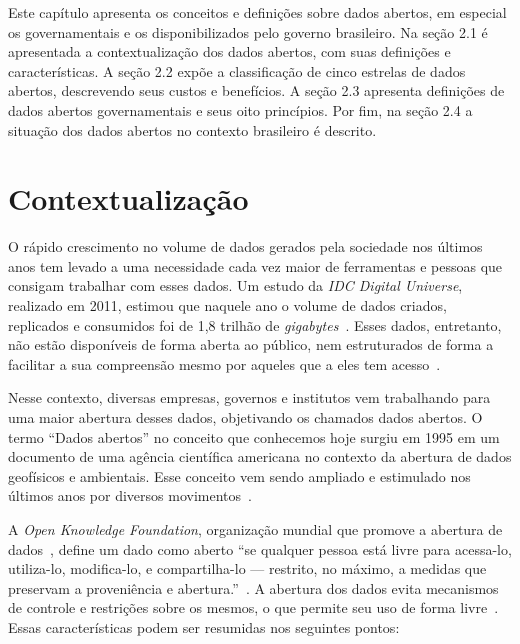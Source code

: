 Este capítulo apresenta os conceitos e definições sobre dados abertos, em especial os governamentais e os disponibilizados pelo governo brasileiro. Na seção 2.1 é apresentada a contextualização dos dados abertos, com suas definições e características. A seção 2.2 expõe a classificação de cinco estrelas de dados abertos, descrevendo seus custos e benefícios. A seção 2.3 apresenta definições de dados abertos governamentais e seus oito princípios. Por fim, na seção 2.4 a situação dos dados abertos no contexto brasileiro é descrito.

\section{Contextualização}

O rápido crescimento no volume de dados gerados pela sociedade nos últimos anos tem levado a uma necessidade cada vez maior de ferramentas e pessoas que consigam trabalhar com esses dados. Um estudo da \emph{IDC Digital Universe}, realizado em 2011, estimou que naquele ano o volume de dados criados, replicados e consumidos foi de 1,8 trilhão de \emph{gigabytes}~\cite{gantz2012digital}. Esses dados, entretanto, não estão disponíveis de forma aberta ao público, nem estruturados de forma a facilitar a sua compreensão mesmo por aqueles que a eles tem acesso~\cite{seijiconectados}. 

Nesse contexto, diversas empresas, governos e institutos vem trabalhando para uma maior abertura desses dados, objetivando os chamados dados abertos. O termo \enquote{Dados abertos} no conceito que conhecemos hoje surgiu em 1995 em um documento de uma agência científica americana no contexto da abertura de dados geofísicos e ambientais. Esse conceito vem sendo ampliado e estimulado nos últimos anos por diversos movimentos~\cite{seijiconectados}. 

A \emph{Open Knowledge Foundation}, organização mundial que promove a abertura de dados~\cite{openknowledge}, define um dado como aberto \enquote{se qualquer pessoa está livre para acessa-lo, utiliza-lo, modifica-lo, e compartilha-lo — restrito, no máximo, a medidas que preservam a proveniência e abertura.}~\cite{opendefinition}. A abertura dos dados evita mecanismos de controle e restrições sobre os mesmos, o que permite seu uso de forma livre~\cite{seijiconectados}. Essas características podem ser resumidas nos seguintes pontos:


